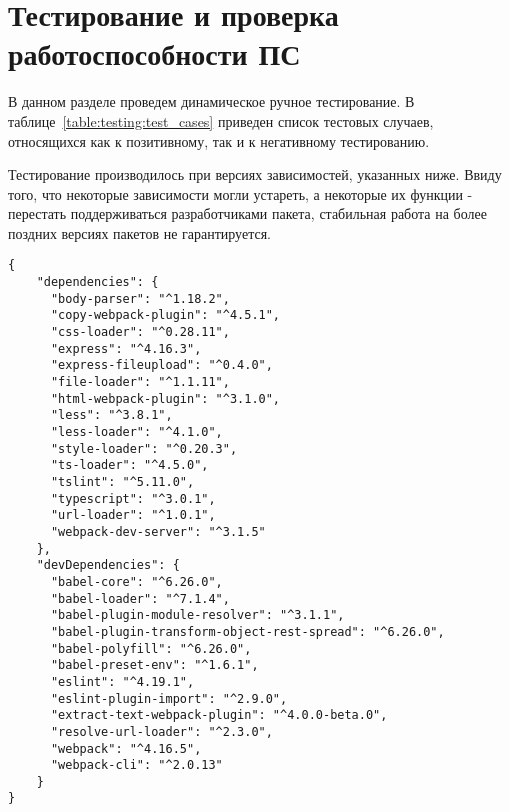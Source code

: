 \section{Тестирование и проверка работоспособности ПС}
\label{sec:testing}

В данном разделе проведем динамическое ручное тестирование. В таблице~\ref{table:testing:test_cases} приведен список тестовых случаев, относящихся как к позитивному, так и к негативному тестированию.

Тестирование производилось при версиях зависимостей, указанных ниже. Ввиду того, что некоторые зависимости могли устареть, а некоторые их функции - перестать поддерживаться разработчиками пакета, стабильная работа на более поздних версиях пакетов не гарантируется.

\begin{lstlisting}
{
	"dependencies": {
      "body-parser": "^1.18.2",
      "copy-webpack-plugin": "^4.5.1",
      "css-loader": "^0.28.11",
      "express": "^4.16.3",
      "express-fileupload": "^0.4.0",
      "file-loader": "^1.1.11",
      "html-webpack-plugin": "^3.1.0",
      "less": "^3.8.1",
      "less-loader": "^4.1.0",
      "style-loader": "^0.20.3",
      "ts-loader": "^4.5.0",
      "tslint": "^5.11.0",
      "typescript": "^3.0.1",
      "url-loader": "^1.0.1",
      "webpack-dev-server": "^3.1.5"
	},
	"devDependencies": {
      "babel-core": "^6.26.0",
      "babel-loader": "^7.1.4",
      "babel-plugin-module-resolver": "^3.1.1",
      "babel-plugin-transform-object-rest-spread": "^6.26.0",
      "babel-polyfill": "^6.26.0",
      "babel-preset-env": "^1.6.1",
      "eslint": "^4.19.1",
      "eslint-plugin-import": "^2.9.0",
      "extract-text-webpack-plugin": "^4.0.0-beta.0",
      "resolve-url-loader": "^2.3.0",
      "webpack": "^4.16.5",
      "webpack-cli": "^2.0.13"
	}
}
\end{lstlisting}

\newcommand\testnumber{\stepcounter{testnumber}\arabic{testnumber}}

\renewcommand{\labelenumi}{\arabic{enumi})}
\renewcommand{\labelenumii}{\asbuk{enumii})}

